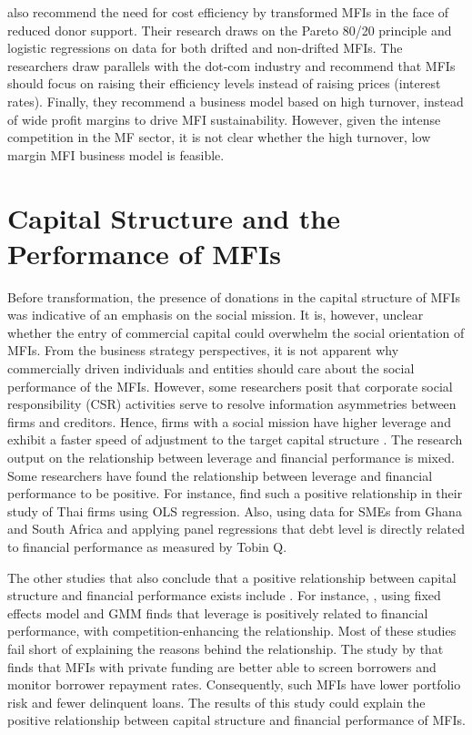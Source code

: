 \documentclass[a4paper, nobind]{templates/ociamthesis}
\begin{document}
\textcite{serrano2014microfinance} also recommend the need for cost efficiency by transformed MFIs in the face of reduced donor support. Their research draws on the Pareto 80/20 principle and logistic regressions on data for both drifted and non-drifted MFIs. The researchers draw parallels with the dot-com industry and recommend that MFIs should focus on raising their efficiency levels instead of raising prices (interest rates). Finally, they recommend a business model based on high turnover, instead of wide profit margins to drive MFI sustainability. However, given the intense competition in the MF sector, it is not clear whether the high turnover, low margin MFI business model is feasible.

\hypertarget{capital-structure-and-the-performance-of-mfis}{%
\section{Capital Structure and the Performance of MFIs}\label{capital-structure-and-the-performance-of-mfis}}

\noindent Before transformation, the presence of donations in the capital structure of MFIs was indicative of an emphasis on the social mission. It is, however, unclear whether the entry of commercial capital could overwhelm the social orientation of MFIs. From the business strategy perspectives, it is not apparent why commercially driven individuals and entities should care about the social performance of the MFIs. However, some researchers posit that corporate social responsibility (CSR) activities serve to resolve information asymmetries between firms and creditors. Hence, firms with a social mission have higher leverage and exhibit a faster speed of adjustment to the target capital structure \autocite{yang2018does}.
The research output on the relationship between leverage and financial performance is mixed. Some researchers have found the relationship between leverage and financial performance to be positive. For instance,\textcite{detthamrong2017corporate} find such a positive relationship in their study of Thai firms using OLS regression. Also, \textcite{abor2007debt} using data for SMEs from Ghana and South Africa and applying panel regressions that debt level is directly related to financial performance as measured by Tobin Q.

The other studies that also conclude that a positive relationship between capital structure and financial performance exists include \autocite{abor2005effect,berger2006capital,gill2011effect}. For instance, \textcite{fosu2013capital}, using fixed effects model and GMM finds that leverage is positively related to financial performance, with competition-enhancing the relationship. Most of these studies fail short of explaining the reasons behind the relationship. The study by \textcite{chakravarty2015role} that finds that MFIs with private funding are better able to screen borrowers and monitor borrower repayment rates. Consequently, such MFIs have lower portfolio risk and fewer delinquent loans. The results of this study could explain the positive relationship between capital structure and financial performance of MFIs.
\end{document}
